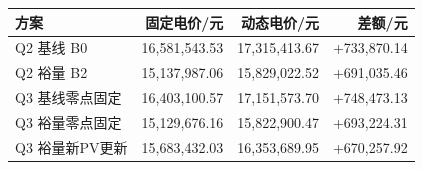 \begin{tabular}{lrrr}
\toprule
方案 & 固定电价/元 & 动态电价/元 & 差额/元 \\
\midrule
Q2 基线 B0 & 16,581,543.53 & 17,315,413.67 & +733,870.14 \\
Q2 裕量 B2 & 15,137,987.06 & 15,829,022.52 & +691,035.46 \\
Q3 基线零点固定 & 16,403,100.57 & 17,151,573.70 & +748,473.13 \\
Q3 裕量零点固定 & 15,129,676.16 & 15,822,900.47 & +693,224.31 \\
Q3 裕量新PV更新 & 15,683,432.03 & 16,353,689.95 & +670,257.92 \\
\bottomrule
\end{tabular}
